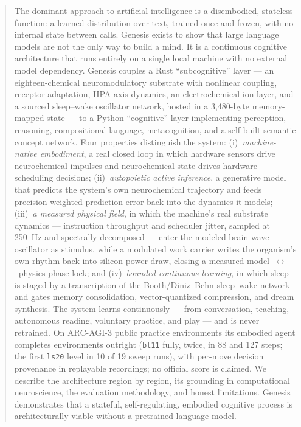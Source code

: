 \documentclass[11pt]{article}
\begin{document}
\begin{abstract}
\noindent
The dominant approach to artificial intelligence is a disembodied,
stateless function: a learned distribution over text, trained once and
frozen, with no internal state between calls. Genesis exists to show
that large language models are not the only way to build a mind. It is
a continuous cognitive architecture that runs
entirely on a single local machine with no external model dependency.
Genesis couples a Rust ``subcognitive'' layer --- an eighteen-chemical
neuromodulatory substrate with nonlinear coupling, receptor adaptation,
HPA-axis dynamics, an electrochemical ion layer, and a sourced
sleep--wake oscillator network, hosted in a 3{,}480-byte memory-mapped
state --- to a Python ``cognitive'' layer implementing perception,
reasoning, compositional language, metacognition, and a self-built
semantic concept network. Four properties distinguish the system:
(i)~\emph{machine-native embodiment}, a real closed loop in which
hardware sensors drive neurochemical impulses and neurochemical state
drives hardware scheduling decisions; (ii)~\emph{autopoietic active
inference}, a generative model that predicts the system's own
neurochemical trajectory and feeds precision-weighted prediction error
back into the dynamics it models; (iii)~\emph{a measured physical
field}, in which the machine's real substrate dynamics --- instruction
throughput and scheduler jitter, sampled at 250~Hz and spectrally
decomposed --- enter the modeled brain-wave oscillator as stimulus,
while a modulated work carrier writes the organism's own rhythm back
into silicon power draw, closing a measured model~$\leftrightarrow$~physics
phase-lock; and (iv)~\emph{bounded continuous learning}, in which sleep
is staged by a transcription of the Booth/Diniz~Behn sleep--wake
network \cite{booth2013,booth2017}
and gates memory consolidation, vector-quantized compression, and dream
synthesis. The system learns continuously --- from conversation,
teaching, autonomous reading, voluntary practice, and play --- and is
never retrained. On ARC-AGI-3 public practice environments its embodied
agent completes environments outright (\texttt{bt11} fully, twice, in 88
and 127 steps; the first \texttt{ls20} level in 10 of 19 sweep runs),
with per-move decision provenance in replayable recordings; no official
score is claimed. We describe the architecture region by region, its
grounding in computational neuroscience, the evaluation methodology,
and honest limitations. Genesis demonstrates that a stateful,
self-regulating, embodied cognitive process is architecturally viable
without a pretrained language model.
\end{abstract}
\end{document}

